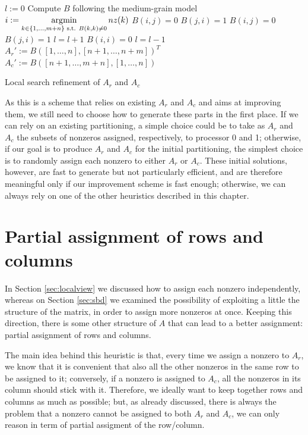 \begin{algorithm}[h]
	\begin{algorithmic}
		\State $l := 0$
		\State Compute $B$ following the medium-grain model
		\State $\displaystyle i := \operatorname*{\arg\!\min}_{k \in \{1,\dots,m+n\}\text{ s.t. }B(k,k) \neq 0} nz(k)$
		\State $B(i,j) = 0$
		\State $B(j,i) = 1$
		\Else
		\State $B(i,j) = 0$
		\State $B(j,i) = 1$
		\State $l = l+1$
		\EndIf
		\EndIf
		\EndFor
		\State $B(i,i) = 0$
		\State $l = l-1$
		\EndIf
		\EndFor
		\State $A_r' := B([1,\dots,n],[n+1,\dots,n+m])^T$
		\State $A_c' := B([n+1,\dots,m+n],[1,\dots,n])$	
	\end{algorithmic}
	\caption{Local search refinement of $A_r$ and $A_c$} \label{alg:globalview}
\end{algorithm}

As this is a scheme that relies on existing $A_r$ and $A_c$ and aims at improving them, we still need to choose how to generate these parts in the first place. If we can rely on an existing partitioning, a simple choice could be to take as $A_r$ and $A_c$ the subsets of nonzeros assigned, respectively, to processor 0 and 1; otherwise, if our goal is to produce $A_r$ and $A_c$ for the initial partitioning, the simplest choice is to randomly assign each nonzero to either $A_r$ or $A_c$. These initial solutions, however, are fast to generate but not particularly efficient, and are therefore meaningful only if our improvement scheme is fast enough; otherwise, we can always rely on one of the other heuristics described in this chapter.

\section{Partial assignment of rows and columns} \label{sec:hot_restart}

In Section \ref{sec:localview} we discussed how to assign each nonzero independently, whereas on Section \ref{sec:sbd} we examined the possibility of exploiting a little the structure of the matrix, in order to assign more nonzeros at once. Keeping this direction, there is some other structure of $A$ that can lead to a better assignment: partial assignment of rows and columns.

The main idea behind this heuristic is that, every time we assign a nonzero to $A_r$, we know that it is convenient that also all the other nonzeros in the same row to be assigned to it; conversely, if a nonzero is assigned to $A_c$, all the nonzeros in its column should stick with it. Therefore, we ideally want to keep together rows and columns as much as possible; but, as already discussed, there is always the problem that a nonzero cannot be assigned to both $A_r$ and $A_c$, we can only reason in term of partial assigment of the row/column. 

